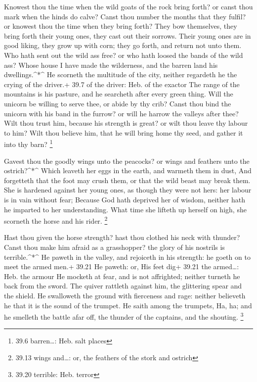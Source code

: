  Knowest thou the time when the wild goats of the rock bring
forth? or canst thou mark when the hinds do calve?  Canst
thou number the months that they fulfil? or knowest thou the time when
they bring forth?  They bow themselves, they bring forth
their young ones, they cast out their sorrows.  Their young
ones are in good liking, they grow up with corn; they go forth, and
return not unto them.  Who hath sent out the wild ass free?
or who hath loosed the bands of the wild ass?  Whose house I
have made the wilderness, and the barren land his dwellings.\^{}*\^{}
 He scorneth the multitude of the city, neither regardeth he
the crying of the driver.+ 39.7 of the driver: Heb. of the exactor
 The range of the mountains is his pasture, and he searcheth
after every green thing.  Will the unicorn be willing to
serve thee, or abide by thy crib?  Canst thou bind the
unicorn with his band in the furrow? or will he harrow the valleys after
thee?  Wilt thou trust him, because his strength is great?
or wilt thou leave thy labour to him?  Wilt thou believe
him, that he will bring home thy seed, and gather it into thy barn?
\footnote{39.6 barren\ldots: Heb. salt places}

 Gavest thou the goodly wings unto the peacocks? or wings
and feathers unto the ostrich?\^{}*\^{}  Which leaveth her
eggs in the earth, and warmeth them in dust,  And
forgetteth that the foot may crush them, or that the wild beast may
break them.  She is hardened against her young ones, as
though they were not hers: her labour is in vain without fear;
 Because God hath deprived her of wisdom, neither hath he
imparted to her understanding.  What time she lifteth up
herself on high, she scorneth the horse and his rider. \footnote{39.13
  wings and\ldots: or, the feathers of the stork and ostrich}

 Hast thou given the horse strength? hast thou clothed his
neck with thunder?  Canst thou make him afraid as a
grasshopper? the glory of his nostrils is terrible.\^{}*\^{}
 He paweth in the valley, and rejoiceth in his strength: he
goeth on to meet the armed men.+ 39.21 He paweth: or, His feet dig+
39.21 the armed\ldots: Heb. the armour  He mocketh at fear,
and is not affrighted; neither turneth he back from the sword.
 The quiver rattleth against him, the glittering spear and
the shield.  He swalloweth the ground with fierceness and
rage: neither believeth he that it is the sound of the trumpet.
 He saith among the trumpets, Ha, ha; and he smelleth the
battle afar off, the thunder of the captains, and the shouting.
\footnote{39.20 terrible: Heb. terror}

